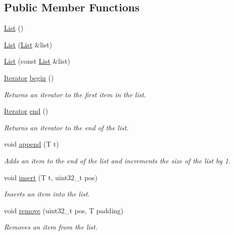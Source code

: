 \subsection*{Public Member Functions}
\begin{DoxyCompactItemize}
\item 
\hyperlink{classetk_1_1_list_ad9b5592df871a39445c6c0debadf324d}{List} ()
\item 
\hyperlink{classetk_1_1_list_a23f9b0efe027159f914214d126b486b3}{List} (\hyperlink{classetk_1_1_list}{List} \&list)
\item 
\hyperlink{classetk_1_1_list_ac85e0e37f248ba1b52f410cd00c8c304}{List} (const \hyperlink{classetk_1_1_list}{List} \&list)
\item 
\hyperlink{classetk_1_1_list_1_1_iterator}{Iterator} \hyperlink{classetk_1_1_list_afb70c4551d2e9ebc6b4bb04337d081e6}{begin} ()
\begin{DoxyCompactList}\small\item\em Returns an iterator to the first item in the list. \end{DoxyCompactList}\item 
\hyperlink{classetk_1_1_list_1_1_iterator}{Iterator} \hyperlink{classetk_1_1_list_a19b25cd89872debc07cc002c18845578}{end} ()
\begin{DoxyCompactList}\small\item\em Returns an iterator to the end of the list. \end{DoxyCompactList}\item 
void \hyperlink{classetk_1_1_list_a45df48bc3bb87c2dd26e56f51115ab27}{append} (T t)
\begin{DoxyCompactList}\small\item\em Adds an item to the end of the list and increments the size of the list by 1. \end{DoxyCompactList}\item 
void \hyperlink{classetk_1_1_list_ab47f8050890b94557ff7cb58ab3367e7}{insert} (T t, uint32\-\_\-t pos)
\begin{DoxyCompactList}\small\item\em Inserts an item into the list. \end{DoxyCompactList}\item 
void \hyperlink{classetk_1_1_list_a524bda3c62abb7aec5b42aa3f835f715}{remove} (uint32\-\_\-t pos, T padding)
\begin{DoxyCompactList}\small\item\em Removes an item from the list. \end{DoxyCompactList}\item 

\end{DoxyCompactItemize}
